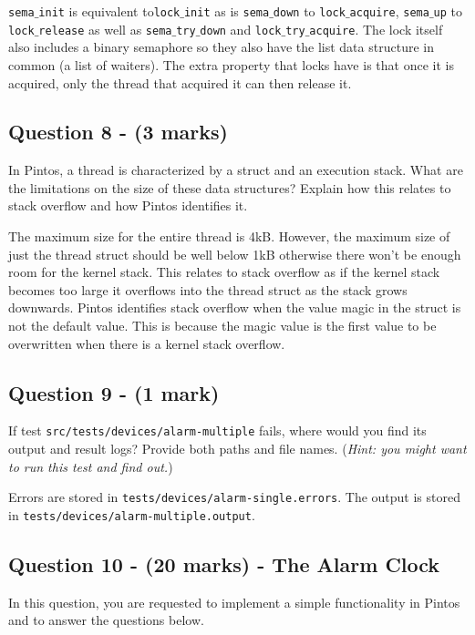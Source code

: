 \documentclass[a4paper,12pt]{article}
\begin{document}
\texttt{sema$\_$init} is equivalent to\texttt{lock$\_$init} as is \texttt{sema$\_$down} to \texttt{lock$\_$acquire}, \texttt{sema$\_$up} to \texttt{lock$\_$release} as well as \texttt{sema$\_$try$\_$down} and \texttt{lock$\_$try$\_$acquire}. The lock itself also includes a binary semaphore so they also have the list data structure in common (a list of waiters).
The extra property that locks have is that once it is acquired, only the thread that acquired it can then release it. \\

\subsection*{Question 8 - (3 marks)}
In Pintos, a thread is characterized by a struct and an execution stack.
What are the limitations on the size of these data structures?
Explain how this relates to stack overflow and how Pintos identifies it.

The maximum size for the entire thread is 4kB. However, the maximum size of just the thread struct should be well below 1kB otherwise there won't be enough room for the kernel stack. This relates to stack overflow as if the kernel stack becomes too large it overflows into the thread struct as the stack grows downwards. Pintos identifies stack overflow when the value magic in the struct is not the default value. This is because the magic value is the first value to be overwritten when there is a kernel stack overflow.\\

\subsection*{Question 9 - (1 mark)}
If test \texttt{src/tests/devices/alarm-multiple} fails, where would you find its output and result logs?
Provide both paths and file names.
(\textit{Hint: you might want to run this test and find out.})

Errors are stored in \texttt{tests/devices/alarm-single.errors}. The output is stored in \texttt{tests/devices/alarm-multiple.output}.

\subsection*{Question 10 - (20 marks) - The Alarm Clock}
In this question, you are requested to implement a simple functionality in Pintos and to answer the questions below.
\end{document}
